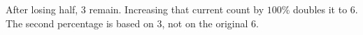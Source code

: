 After losing half, $3$ remain. Increasing that current count by $100\%$ doubles it to $\boxed6$. The second percentage is based on $3$, not on the original $6$.
